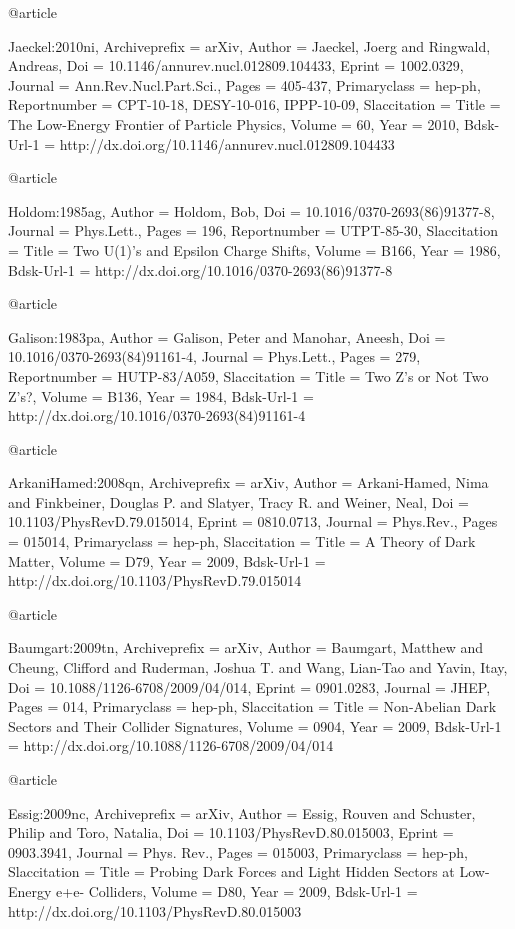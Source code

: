 @article{Jaeckel:2010ni,
	Archiveprefix = {arXiv},
	Author = {Jaeckel, Joerg and Ringwald, Andreas},
	Doi = {10.1146/annurev.nucl.012809.104433},
	Eprint = {1002.0329},
	Journal = {Ann.Rev.Nucl.Part.Sci.},
	Pages = {405-437},
	Primaryclass = {hep-ph},
	Reportnumber = {CPT-10-18, DESY-10-016, IPPP-10-09},
	Slaccitation = {%
	Title = {{The Low-Energy Frontier of Particle Physics}},
	Volume = {60},
	Year = {2010},
	Bdsk-Url-1 = {http://dx.doi.org/10.1146/annurev.nucl.012809.104433}
}

@article{Holdom:1985ag,
	Author = {Holdom, Bob},
	Doi = {10.1016/0370-2693(86)91377-8},
	Journal = {Phys.Lett.},
	Pages = {196},
	Reportnumber = {UTPT-85-30},
	Slaccitation = {%
	Title = {{Two U(1)'s and Epsilon Charge Shifts}},
	Volume = {B166},
	Year = {1986},
	Bdsk-Url-1 = {http://dx.doi.org/10.1016/0370-2693(86)91377-8}
}

@article{Galison:1983pa,
	Author = {Galison, Peter and Manohar, Aneesh},
	Doi = {10.1016/0370-2693(84)91161-4},
	Journal = {Phys.Lett.},
	Pages = {279},
	Reportnumber = {HUTP-83/A059},
	Slaccitation = {%
	Title = {{Two Z's or Not Two Z's?}},
	Volume = {B136},
	Year = {1984},
	Bdsk-Url-1 = {http://dx.doi.org/10.1016/0370-2693(84)91161-4}
}

@article{ArkaniHamed:2008qn,
	Archiveprefix = {arXiv},
	Author = {Arkani-Hamed, Nima and Finkbeiner, Douglas P. and Slatyer, Tracy R. and Weiner, Neal},
	Doi = {10.1103/PhysRevD.79.015014},
	Eprint = {0810.0713},
	Journal = {Phys.Rev.},
	Pages = {015014},
	Primaryclass = {hep-ph},
	Slaccitation = {%
	Title = {{A Theory of Dark Matter}},
	Volume = {D79},
	Year = {2009},
	Bdsk-Url-1 = {http://dx.doi.org/10.1103/PhysRevD.79.015014}
}

@article{Baumgart:2009tn,
	Archiveprefix = {arXiv},
	Author = {Baumgart, Matthew and Cheung, Clifford and Ruderman, Joshua T. and Wang, Lian-Tao and Yavin, Itay},
	Doi = {10.1088/1126-6708/2009/04/014},
	Eprint = {0901.0283},
	Journal = {JHEP},
	Pages = {014},
	Primaryclass = {hep-ph},
	Slaccitation = {%
	Title = {{Non-Abelian Dark Sectors and Their Collider Signatures}},
	Volume = {0904},
	Year = {2009},
	Bdsk-Url-1 = {http://dx.doi.org/10.1088/1126-6708/2009/04/014}
}

@article{Essig:2009nc,
	Archiveprefix = {arXiv},
	Author = {Essig, Rouven and Schuster, Philip and Toro, Natalia},
	Doi = {10.1103/PhysRevD.80.015003},
	Eprint = {0903.3941},
	Journal = {Phys. Rev.},
	Pages = {015003},
	Primaryclass = {hep-ph},
	Slaccitation = {%
	Title = {{Probing Dark Forces and Light Hidden Sectors at Low-Energy e+e- Colliders}},
	Volume = {D80},
	Year = {2009},
	Bdsk-Url-1 = {http://dx.doi.org/10.1103/PhysRevD.80.015003}
}

}}}}}}
